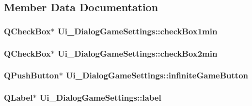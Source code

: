 \subsection{Member Data Documentation}
\hypertarget{class_ui___dialog_game_settings_a2144e6c4c4c36806ab244689d5ad29b1}{
\subsubsection[{check\-Box1min}]{\setlength{\rightskip}{0pt plus 5cm}Q\-Check\-Box$\ast$ Ui\-\_\-\-Dialog\-Game\-Settings\-::check\-Box1min}}\label{class_ui___dialog_game_settings_a2144e6c4c4c36806ab244689d5ad29b1}
\hypertarget{class_ui___dialog_game_settings_af65933a6ca19450ec9d170436d7d4024}{
\subsubsection[{check\-Box2min}]{\setlength{\rightskip}{0pt plus 5cm}Q\-Check\-Box$\ast$ Ui\-\_\-\-Dialog\-Game\-Settings\-::check\-Box2min}}\label{class_ui___dialog_game_settings_af65933a6ca19450ec9d170436d7d4024}
\hypertarget{class_ui___dialog_game_settings_a283359b60692817ea7b7099dde4b5fd5}{
\subsubsection[{infinite\-Game\-Button}]{\setlength{\rightskip}{0pt plus 5cm}Q\-Push\-Button$\ast$ Ui\-\_\-\-Dialog\-Game\-Settings\-::infinite\-Game\-Button}}\label{class_ui___dialog_game_settings_a283359b60692817ea7b7099dde4b5fd5}
\hypertarget{class_ui___dialog_game_settings_a133d7ca29a48667080c9110ecbe2d700}{
\subsubsection[{label}]{\setlength{\rightskip}{0pt plus 5cm}Q\-Label$\ast$ Ui\-\_\-\-Dialog\-Game\-Settings\-::label}}\label{class_ui___dialog_game_settings_a133d7ca29a48667080c9110ecbe2d700}
